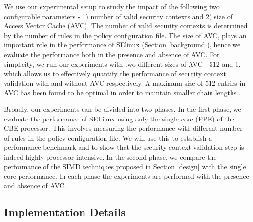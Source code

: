 \documentclass[conference]{IEEEtran}
\begin{document}
We use our experimental setup to study the impact of the following two configurable parameters - 1) number of valid security contexts and 2) size of Access Vector Cache (AVC). The number of valid
security contexts is determined by the number of rules in the policy
configuration file. The size of AVC, plays an important role in the performance of SElinux (Section \ref{background}), hence we evaluate
the performance both in the presence and absence of AVC. For
simplicity, we run our experiments with two different sizes of AVC -
512 and 1, which allows us to effectively quantify the performance of
security context validation with and without AVC respectively. A maximum size of 512 entries in AVC has been found to be optimal in order to maintain smaller chain lengths \cite{selinuxBook}.

Broadly, our experiments can be divided into two phases. In the first phase, we evaluate the performance of SELinux using only the single core (PPE) of the CBE processor. This involves measuring the performance with different number of rules in the policy configuration file. We will use this to establish a performance benchmark and to show that the security context validation step is indeed highly processor intensive. In the second phase, we compare the performance of the SIMD techniques proposed in Section \ref{design} with the single core performance. In each phase the experiments are performed with the presence and absence of AVC. 

\subsection{Implementation Details}\label{impl}
\end{document}
